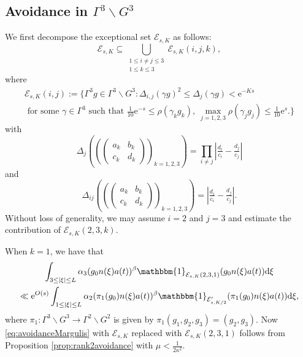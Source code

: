 \documentclass[12pt]{amsart}
\theoremstyle{definition}
\theoremstyle{remark}
\numberwithin{equation}{section}
\newcommand{\dd}{\mathrm{d}}
\newcommand{\e}{\mathrm{e}}
\newcommand{\cE}{\mathcal{E}}
\begin{document}
\subsection{Avoidance in $\Gamma^3 \backslash G^3$}
\label{sec:avoidanceproof}


We first decompose the exceptional set $\cE_{s,K}$ as follows:
\begin{equation}
  \label{eq:cEdecomp}
  \cE_{s,K}\subseteq\bigcup_{\substack{1\leq i\neq j \leq 3 \\ 1\leq k \leq 3}}\cE_{s,K}(i,j, k),
\end{equation}
where
\begin{multline}
  \label{eq:decompparts}
  \cE_{s,K}(i, j):=\{\Gamma^3 g\in \Gamma^3 \backslash G^3: 
  \Delta_{i,j}(\gamma g)^2 \leq\Delta_{j}(\gamma g)< \e^{-Ks} \\
  \textrm{ for some } \gamma \in \Gamma^3 \textrm{ such that } \tfrac{1}{10} \e^{-s}\leq \rho(\gamma_k g_k),\ \max_{j=1,2,3} \rho(\gamma_j g_j) \leq \tfrac{1}{10} \e^{s}.\}
  \end{multline}
with
\begin{equation}
  \label{eq:Deltadef2}
  \Delta_{j}\left(\left(\begin{pmatrix}    a_k & b_k\\
    c_k & d_k
  \end{pmatrix}
  \right)_{k=1,2,3}\right)= \prod_{i \neq j}|\tfrac{d_{i}}{c_{i}}-\tfrac{d_{j}}{c_{j}}|
\end{equation}
and
\begin{equation}
  \label{eq:Deltaijdef}
  \Delta_{ij}\left(\left(\begin{pmatrix}    a_k & b_k\\
    c_k & d_k
  \end{pmatrix}
  \right)_{k=1,2,3}\right) = |\tfrac{d_i}{c_i} - \tfrac{d_j}{c_j}|. 
\end{equation}
Without loss of generality, we may assume $i=2$ and $j=3$ and estimate the contribution of $\cE_{s,K}(2,3,k)$.

When $k = 1$, we have that
\begin{multline}
  \label{eq:rank2reduction1}
  \int_{3\leq |\xi| \leq L} \alpha_3(g_0n(\xi) a(t))^\beta \mathbbm{1}_{\cE_{s,K}(2,3,1)}(g_0n(\xi)a(t)) \dd \xi \\
  \ll \e^{O(s)} \int_{1\leq |\xi| \leq L} \alpha_2(\pi_1(g_0)n(\xi) a(t))^\beta \mathbbm{1}_{\cE'_{s,K/2}}(\pi_1(g_0)n(\xi)a(t)) \dd \xi,
\end{multline}
where $\pi_1: \Gamma^3 \backslash G^3 \to \Gamma^2 \backslash G^2$ is given by $\pi_1(g_1,g_2, g_3)= (g_2, g_3)$.
Now \eqref{eq:avoidanceMargulis} with $\cE_{s,K}$ replaced with $\cE_{s,K}(2,3,1)$ follows from Proposition \ref{prop:rank2avoidance} with $\mu < \tfrac{1}{2\kappa^2}$. 
\end{document}
